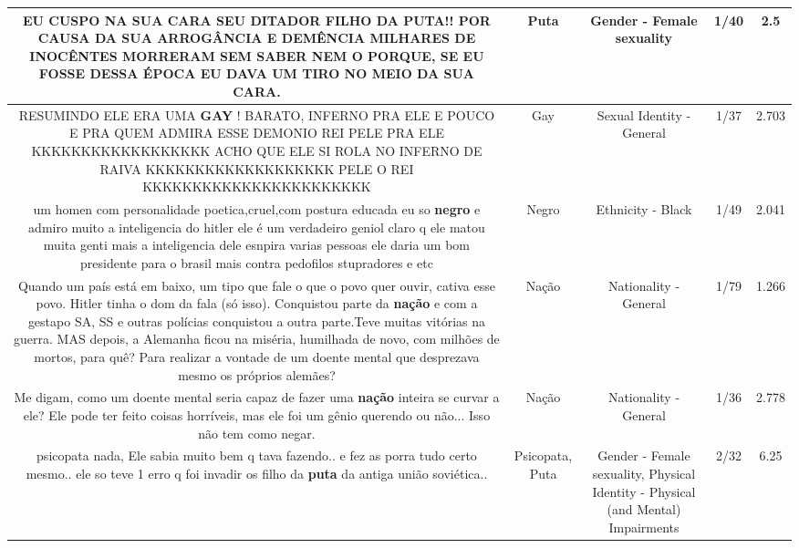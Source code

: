 \documentclass[11pt]{article}
\newlength\mylength
\begin{document}
\begin{center}
\begin{longtable}{|C{.65\mylength}|C{.30\mylength}|C{.12\mylength}|C{.12\mylength}|C{.12\mylength}|}
  \small EU CUSPO NA SUA CARA SEU DITADOR FILHO DA \textbf{PUTA}!! POR CAUSA DA SUA ARROGÂNCIA E DEMÊNCIA MILHARES DE INOCÊNTES MORRERAM SEM SABER NEM O PORQUE, SE EU FOSSE DESSA ÉPOCA EU DAVA UM TIRO NO MEIO DA SUA CARA.\normalsize   & Puta & Gender - Female sexuality & 1/40 & 2.5 \\  \hline
  \small RESUMINDO  ELE ERA  UMA  \textbf{GAY} !  BARATO,  INFERNO  PRA  ELE E POUCO  E PRA   QUEM ADMIRA  ESSE  DEMONIO  REI  PELE  PRA  ELE  KKKKKKKKKKKKKKKKKK  ACHO  QUE ELE  SI  ROLA NO INFERNO DE  RAIVA   KKKKKKKKKKKKKKKKKKK  PELE  O  REI  KKKKKKKKKKKKKKKKKKKKKKK\normalsize   & Gay & Sexual Identity - General & 1/37 & 2.703 \\  \hline
  \small um homen com personalidade poetica,cruel,com postura educada eu so \textbf{negro} e admiro muito a inteligencia do hitler ele é um verdadeiro geniol claro q ele matou muita genti mais a inteligencia dele esnpira varias pessoas   ele daria um bom presidente para o brasil mais contra pedofilos stupradores e etc\normalsize   & Negro & Ethnicity - Black & 1/49 & 2.041 \\  \hline
  \small Quando um país está em baixo, um tipo que fale o que o povo quer ouvir, cativa esse povo. Hitler tinha o dom da fala (só isso). Conquistou parte da \textbf{nação} e com a gestapo SA, SS e outras polícias conquistou a outra parte.Teve muitas vitórias na guerra. MAS  depois, a Alemanha ficou na miséria, humilhada de novo, com milhões de mortos, para quê? Para realizar a vontade de um doente mental que desprezava mesmo os próprios alemães?\normalsize   & Nação & Nationality - General & 1/79 & 1.266 \\  \hline
  \small Me digam, como um doente mental seria capaz de fazer uma \textbf{nação} inteira se curvar a ele? Ele pode ter feito coisas horríveis, mas ele foi um gênio querendo ou não... Isso não tem como negar.\normalsize   & Nação & Nationality - General & 1/36 & 2.778 \\  \hline
  \small psicopata nada,  Ele sabia muito bem q tava fazendo.. e fez as porra tudo certo mesmo.. ele so teve 1 erro q foi invadir os filho da \textbf{puta} da antiga união soviética..\normalsize   & Psicopata, Puta & Gender - Female sexuality, Physical Identity - Physical (and Mental) Impairments & 2/32 & 6.25 \\  \hline

\end{longtable}
\end{center}
\end{document}
